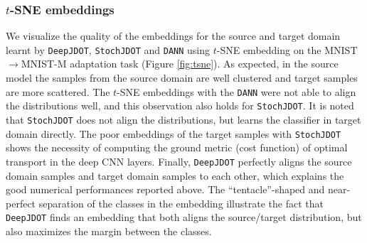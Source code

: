 \documentclass[runningheads]{llncs}
\begin{document}
\subsubsection{$t$-SNE embeddings} 
We visualize the quality of the embeddings for the source and target domain learnt by \texttt{DeepJDOT}, \texttt{StochJDOT} and \texttt{DANN} using $t$-SNE embedding on the MNIST$\rightarrow$MNIST-M adaptation task (Figure \ref{fig:tsne}). As expected, in the source model the samples from the source domain are well clustered and target samples are more scattered. The $t$-SNE embeddings with the \texttt{DANN} were not able to align the distributions well, and this observation also holds for \texttt{StochJDOT}. It is noted that \texttt{StochJDOT} does not align the distributions, but learns the classifier in target domain directly. The poor embeddings of the target samples with \texttt{StochJDOT} shows the necessity of computing the ground metric (cost function) of optimal transport in the deep CNN layers. Finally, \texttt{DeepJDOT} perfectly aligns the source domain samples and target domain samples to each other, which explains the good numerical performances reported above. The ``tentacle''-shaped and near-perfect separation of the classes in the embedding illustrate the fact that \texttt{DeepJDOT} finds an embedding that both aligns the source/target distribution, but also maximizes the margin between the classes.
\end{document}
